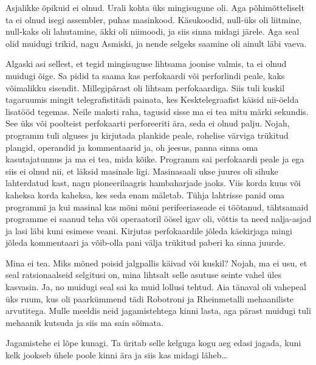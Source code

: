 
Asjalikke õpikuid ei olnud. Urali kohta üks mingisugune oli. Aga põhimõtteliselt ta ei olnud isegi assembler, puhas masinkood. Käsukoodid, null-üks oli liitmine, null-kaks oli lahutamine, äkki oli niimoodi, ja siis sinna midagi järele. Aga seal olid muidugi trikid,  nagu Asmiski, ja nende selgeks saamine oli ainult läbi vaeva. 

Algaski asi sellest, et tegid mingisuguse lihtsama joonise valmis,  ta ei olnud muidugi õige. Sa pidid ta saama kas perfokaardi või perforlindi peale, kaks võimalikku sisendit. Millegipärast oli lihtsam perfokaardiga. Siis tuli kuskil tagaruumis mingit telegrafistitädi painata, kes Kesktelegraafist käisid nii-öelda lisatööd tegemas. Neile maksti raha, tagusid sisse ma ei tea mitu  märki sekundis. See üks või poolteist perfokaarti perforeeriti ära, seda ei olnud palju. Nojah, programm tuli alguses ju kirjutada  plankide peale, rohelise värviga trükitud plangid, operandid ja kommentaarid ja, oh jeesus,  panna sinna oma kasutajatunnus ja ma ei tea, mida kõike. Programm sai perfokaardi peale ja ega siis ei olnud nii, et läksid masinale ligi. Masinasaali ukse juures oli sihuke lahterdatud kast, nagu pioneerilaagris hambaharjade jaoks. Viis korda kuus või kaheksa korda kaheksa, kes seda enam mäletab. Tühja lahtrisse panid oma programmi ja kui masinal kas mõni mõni perifeeriaseade ei töötanud, tähtsamaid programme ei saanud teha või operaatoril öösel igav oli, võttis ta need nalja-asjad ja lasi läbi kuni esimese veani. Kirjutas perfokaardile jõleda käekirjaga mingi jõleda kommentaari ja võib-olla pani välja trükitud paberi ka sinna juurde. 


Mina ei tea. Miks mõned poisid jalgpallis käivad või kuskil? Nojah, ma ei usu, et seal ratsionaalseid selgitusi on, mina lihtsalt selle  asutuse seinte vahel üles kasvasin. Ja, no muidugi seal sai ka muid lollusi tehtud. Aia tänaval oli vahepeal üks ruum, kus oli paarkümmend tädi Robotroni ja  Rheinmetalli  mehaaniliste arvutitega. Mulle meeldis neid jagamistehtega kinni lasta, aga pärast muidugi tuli mehaanik kutsuda ja siis ma sain sõimata. 


Jagamistehe ei lõpe kunagi. Ta üritab selle kelguga kogu aeg edasi jagada, kuni kelk jookseb ühele poole kinni ära ja siis kas midagi läheb\ldots

